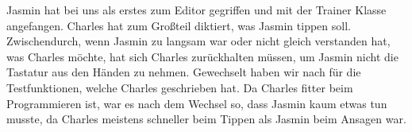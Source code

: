 \documentclass[12pt,a4paper]{article} %
\begin{document}
	Jasmin hat bei uns als erstes zum Editor gegriffen und mit der Trainer Klasse angefangen. Charles hat zum Großteil diktiert, was Jasmin tippen soll. 	
	Zwischendurch, wenn Jasmin zu langsam war oder nicht gleich verstanden hat, was Charles möchte, hat sich Charles zurückhalten müssen, 
	um Jasmin nicht die Tastatur aus den Händen zu nehmen. 
	Gewechselt  haben wir nach für die Testfunktionen, welche Charles geschrieben hat.
	Da Charles fitter beim Programmieren ist, war es nach dem Wechsel so, dass Jasmin kaum etwas tun musste, da Charles meistens schneller beim Tippen 	als Jasmin beim Ansagen war.
\end{document}
